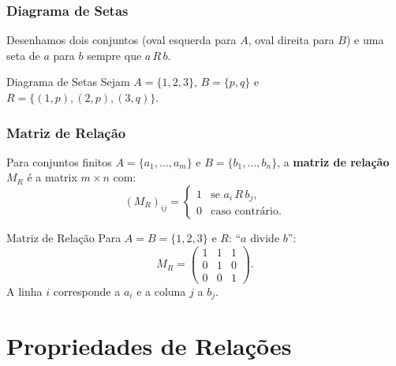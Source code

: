 \documentclass[12pt,a4paper]{book}
\begin{document}
\subsection{Diagrama de Setas}

Desenhamos dois conjuntos (oval esquerda para $A$, oval direita para $B$) e uma seta de $a$ para $b$ sempre que $a\,R\,b$.

\begin{exemplo}{Diagrama de Setas}{}
Sejam $A = \{1,2,3\}$, $B = \{p, q\}$ e $R = \{(1,p),(2,p),(3,q)\}$.

\medskip
\centering
{}
\end{exemplo}

\subsection{Matriz de Relação}

Para conjuntos finitos $A = \{a_1,\dots,a_m\}$ e $B = \{b_1,\dots,b_n\}$, a \textbf{matriz de relação} $M_R$ é a matrix $m \times n$ com:
\[
  (M_R)_{ij} = \begin{cases} 1 & \text{se } a_i\,R\,b_j,\\ 0 & \text{caso contrário.} \end{cases}
\]

\begin{exemplo}{Matriz de Relação}{}
Para $A = B = \{1,2,3\}$ e $R$: ``$a$ divide $b$'':
\[
  M_R = \begin{pmatrix} 1 & 1 & 1 \\ 0 & 1 & 0 \\ 0 & 0 & 1 \end{pmatrix}.
\]
A linha $i$ corresponde a $a_i$ e a coluna $j$ a $b_j$.
\end{exemplo}

\chapter{Propriedades de Relações}
\end{document}
